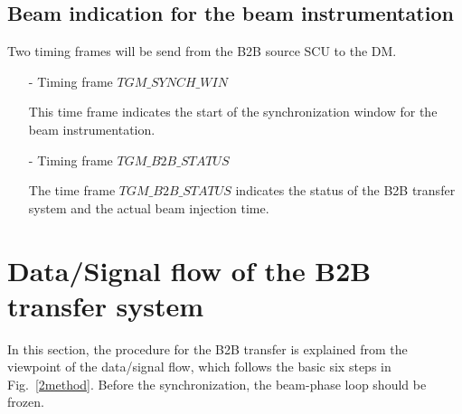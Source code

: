 \subsection{Beam indication for the beam instrumentation}

Two timing frames will be send from the B2B source SCU to the DM.
\begin{itemize}
\item[-] Timing frame $TGM\_SYNCH\_WIN$

This time frame indicates the start of the synchronization window for the beam instrumentation.

\item[-] Timing frame $TGM\_B2B\_STATUS$

The time frame $TGM\_B2B\_STATUS$ indicates the status of the B2B transfer system and the actual beam injection time. 
\end{itemize}
\section{Data/Signal flow of the B2B transfer system}
In this section, the procedure for the B2B transfer is explained from the viewpoint of the data/signal flow, which follows the basic six steps in Fig.~\ref{2method}. Before the synchronization, the beam-phase loop should be frozen. 

